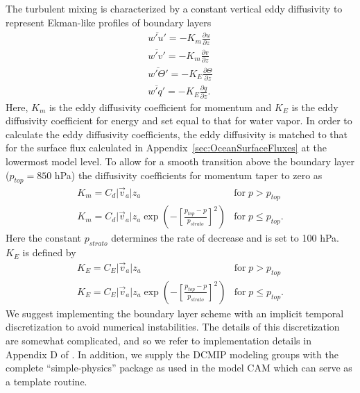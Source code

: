 \documentclass[times,doublespace]{fldauth}
\begin{document}
{\begin{appendix}
The turbulent mixing is characterized by a constant vertical eddy diffusivity to represent Ekman-like profiles of boundary layers
\begin{eqnarray}\label{ktheory}
\overline{w'u'} = -K_m \frac{\partial u}{\partial z} \\
\overline{w'v'} = -K_m \frac{\partial v}{\partial z} \\
\overline{w'\Theta'} = -K_E \frac{\partial \Theta}{\partial z} \\
\overline{w'q'} = -K_E \frac{\partial q}{\partial z}. 
\end{eqnarray}
Here, $K_m$ is the eddy diffusivity coefficient for momentum and $K_E$ is the eddy diffusivity coefficient for energy and set equal to that for water vapor. In order to calculate the eddy diffusivity coefficients, the eddy diffusivity is matched to that for the surface flux calculated in Appendix~\ref{sec:OceanSurfaceFluxes} at the lowermost model level.  To allow for a smooth transition above the boundary layer ($p_{top} = 850$ hPa)  the diffusivity coefficients for momentum taper to zero as
\begin{equation} \label{Kmtaper}
\begin{array}{ll}
K_m = C_d \vert \vec{v}_{a} \vert z_a & \mbox{for} \; p > p_{top} \\
K_m = C_d \vert \vec{v}_{a} \vert z_a \exp \left ( -\left [ \frac{p_{top} - p}{p_{strato}} \right ]^2 \right ) & \mbox{for} \; p \leq p_{top}.
\end{array}
\end{equation}
Here the constant $p_{strato}$ determines the rate of decrease and is set to 100 hPa. $K_E$ is defined by
\begin{equation}
\begin{array}{ll}\label{KEtaper}
K_E = C_E \vert \vec{v}_{a} \vert z_a & \mbox{for} \; p > p_{top} \\
K_E = C_E \vert \vec{v}_{a} \vert z_a \exp \left ( -\left [ \frac{p_{top} - p}{p_{strato}} \right ]^2 \right ) & \mbox{for} \; p \leq p_{top}.
\end{array}
\end{equation}
We suggest implementing the boundary layer scheme with an implicit temporal discretization to avoid numerical instabilities. The details of this discretization are somewhat complicated, and so we refer to implementation details in Appendix D of \cite{reed2012idealized}. In addition, we supply the DCMIP modeling groups with the complete ``simple-physics'' package as used in the model CAM which can serve as a template routine.


\end{appendix}}
\end{document}

